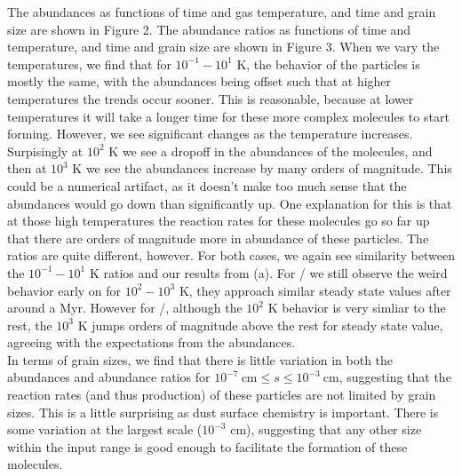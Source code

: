 \documentclass[11pt]{article}
\newenvironment{tight_enumerate}{
    \begin{enumerate}[label=(\alph*)]
    \setlength{\itemsep}{3pt}
    \setlength{\parskip}{0pt}}
    {\end{enumerate}}
\begin{document}
\begin{tight_enumerate}
\item The abundances as functions of time and gas temperature, and time and grain size are shown in Figure 2. The abundance ratios as functions of time and temperature, and time and grain size are shown in Figure 3. When we vary the temperatures, we find that for $10^{-1}{-}10^1$ \si{K}, the behavior of the particles is mostly the same, with the abundances being offset such that at higher temperatures the trends occur sooner. This is reasonable, because at lower temperatures it will take a longer time for these more complex molecules to start forming. However, we see significant changes as the temperature increases. Surpisingly at $10^2$ \si{K} we see a dropoff in the abundances of the molecules, and then at $10^3$ \si{K} we see the abundances increase by many orders of magnitude. This could be a numerical artifact, as it doesn't make too much sense that the abundances would go down than significantly up. One explanation for this is that at those high temperatures the reaction rates for these molecules go so far up that there are orders of magnitude more in abundance of these particles. The ratios are quite different, however. For both cases, we again see similarity between the $10^{-1}{-}10^1$ \si{K} ratios and our results from (a). For / we still observe the weird behavior early on for $10^2{-}10^3$ \si{K}, they approach similar steady state values after around a Myr. However for /, although the $10^2$ \si{K} behavior is very simliar to the rest, the $10^3$ \si{K} jumps orders of magnitude above the rest for steady state value, agreeing with the expectations from the abundances.\\
\indent\hspace{1em} In terms of grain sizes, we find that there is little variation in both the abundances and abundance ratios for $10^{-7}\ \si{\centi\meter} \leq s \leq 10^{-3}\ \si{\centi\meter}$, suggesting that the reaction rates (and thus production) of these particles are not limited by grain sizes. This is a little surprising as dust surface chemistry is important. There is some variation at the largest scale ($10^{-3}$ \si{\centi\meter}), suggesting that any other size within the input range is good enough to facilitate the formation of these molecules.
\begin{figure}[H]
\centering

\end{figure}
\end{tight_enumerate}
\end{document}
